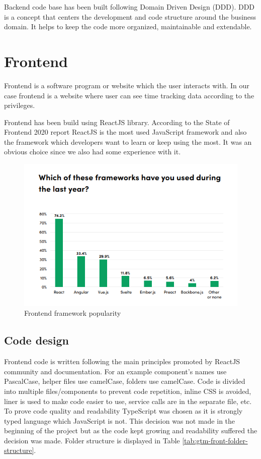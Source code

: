Backend code base has been built following Domain Driven Design (DDD).
DDD is a concept that centers the development and code structure around the business domain.
It helps to keep the code more organized, maintainable and extendable.



\section{Frontend}\label{sec:frontend}
Frontend is a software program or website which the user interacts with.
In our case frontend is a website where user can see time tracking data according to the privileges.

Frontend has been build using ReactJS library.
According to the State of Frontend 2020 report ReactJS is the most used JavaScript framework and also the framework which developers want to learn or keep using the most.
It was an obvious choice since we also had some experience with it.

\begin{figure}[h]
    \includegraphics[width=\textwidth]{figures/frontend_framework_popularity.png}
    \caption{Frontend framework popularity}
    \label{fig:frontend-framework-popularity}
\end{figure}

\subsection{Code design}\label{subsec:code-design}
Frontend code is written following the main principles promoted by ReactJS community and documentation.
For an example component’s names use PascalCase, helper files use camelCase, folders use camelCase.
Code is divided into multiple files/components to prevent code repetition, inline CSS is avoided, liner is used to make code easier to use, service calls are in the separate file, etc.
To prove code quality and readability TypeScript was chosen as it is strongly typed language which JavaScript is not.
This decision was not made in the beginning of the project but as the code kept growing and readability suffered the decision was made.
Folder structure is displayed in Table
\ref{tab:gtm-front-folder-structure}.

